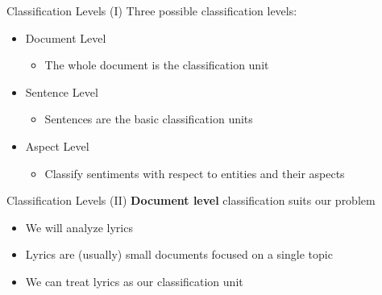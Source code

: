 \documentclass[xcolor=dvipsnames]{beamer}
\begin{document}

\begin{frame}{Classification Levels (I)}
Three possible classification levels:
\begin{itemize}
\item Document Level 
\begin{itemize}
\item The whole document is the classification unit
\end{itemize}
\item Sentence Level
\begin{itemize}
\item Sentences are the basic classification units
\end{itemize}
\item Aspect Level
\begin{itemize}
\item Classify sentiments with respect to entities and their aspects
\end{itemize}
\end{itemize}
\end{frame}

\begin{frame}{Classification Levels (II)}
\textbf{Document level} classification suits our problem
\begin{itemize}
\item We will analyze lyrics
\item Lyrics are (usually) small documents focused on a single topic
\item We can treat lyrics as our classification unit
\end{itemize}
\end{frame}
\end{document}
